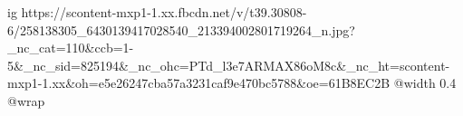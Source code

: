  
 
 
 
 

\ifcmt
  ig https://scontent-mxp1-1.xx.fbcdn.net/v/t39.30808-6/258138305_6430139417028540_213394002801719264_n.jpg?_nc_cat=110&ccb=1-5&_nc_sid=825194&_nc_ohc=PTd_l3e7ARMAX86oM8c&_nc_ht=scontent-mxp1-1.xx&oh=e5e26247cba57a3231caf9e470bc5788&oe=61B8EC2B
  @width 0.4
  @wrap 
\fi
